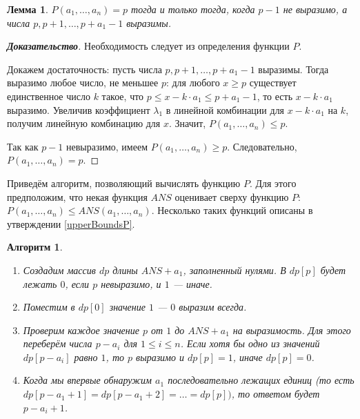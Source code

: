\documentclass[12pt]{article}
\newtheorem{lemma}[theorem]{Лемма}
\newtheorem{algorithm}[theorem]{Алгоритм}
\begin{document}
\begin{lemma}
\label{algorithm1:lemma2}
$P(a_1, \dots, a_n) = p$ тогда и только тогда, когда $p - 1$ не выразимо, а числа $p, p + 1, \dots, p + a_1 - 1$ выразимы.
\end{lemma}
\begin{proof}[\textbf{Доказательство}]
Необходимость следует из определения функции $P$.

Докажем достаточность: пусть числа $p, p + 1, \dots, p + a_1 - 1$ выразимы. Тогда выразимо любое число, не меньшее $p$: для любого $x \ge p$ существует единственное число $k$ такое, что $p \le x - k \cdot a_1 \le p + a_1 - 1$, то есть $x - k \cdot a_1$ выразимо. Увеличив коэффициент $\lambda_1$ в линейной комбинации для $x - k \cdot a_1$ на $k$, получим линейную комбинацию для $x$. Значит, $P(a_1, \dots, a_n) \le p$.

Так как $p - 1$ невыразимо, имеем $P(a_1, \dots, a_n) \ge p$. Следовательно, $P(a_1, \dots, a_n) = p$.
\end{proof}

Приведём алгоритм, позволяющий вычислять функцию $P$. Для этого предположим, что некая функция $ANS$ оценивает сверху функцию $P$: $P(a_1, \dots, a_n) \le ANS(a_1, \dots, a_n)$. Несколько таких функций описаны в утверждении \ref{upperBoundsP}.

\begin{algorithm}
\label{algorithm1}
\begin{enumerate}
    \item Создадим массив $dp$ длины $ANS + a_1$, заполненный нулями. В $dp[p]$ будет лежать $0$, если $p$ невыразимо, и $1$ --- иначе.
    \item Поместим в $dp[0]$ значение $1$ --- $0$ выразим всегда.
    \item Проверим каждое значение $p$ от $1$ до $ANS + a_1$ на выразимость. Для этого переберём числа $p - a_i$ для $1 \le i \le n$. Если хотя бы одно из значений $dp[p - a_i]$ равно $1$, то $p$ выразимо и $dp[p] = 1$, иначе $dp[p] = 0$.
    \item Когда мы впервые обнаружим $a_1$ последовательно лежащих единиц (то есть\\  $dp[p - a_1 + 1] = dp[p - a_1 + 2] = \dots = dp[p])$, то ответом будет $p - a_i + 1$. 
\end{enumerate}
\end{algorithm}
\end{document}
